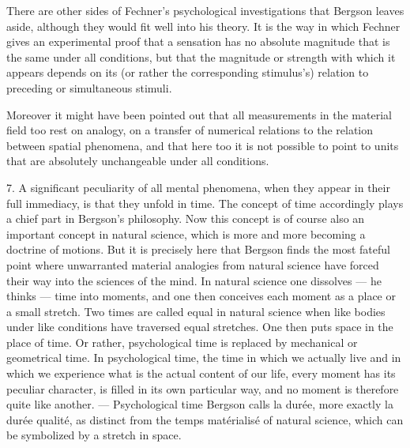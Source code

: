 \documentclass[12pt,a4paper,openany]{book}
\newcommand{\opage}[1]{\marginnote{\footnotesize\textit{[#1]}}}
\begin{document}
There are other sides of Fechner's psychological investigations that Bergson leaves aside, although they would fit well into his theory. It is the way in which Fechner gives an experimental proof that a sensation has no absolute magnitude that is the same under all conditions, but that the magnitude or strength with which it appears depends on its (or rather the corresponding stimulus's) relation to preceding or simultaneous stimuli.

Moreover it might have been pointed out that all measurements in the material field too rest on analogy, on a transfer of numerical relations to the relation between spatial phenomena, and that here too it is not possible to point to units that are absolutely unchangeable under all conditions.

7. A significant peculiarity of all mental phenomena, when they appear in their full immediacy, is that they unfold in time. The concept of time accordingly plays a chief part in Bergson's philosophy. Now this concept is of course also an important concept in natural science, which is more and more becoming a doctrine of motions. But it is precisely here that Bergson finds
\opage{15}the most fateful point where unwarranted material analogies from natural science have forced their way into the sciences of the mind. In natural science one dissolves --- he thinks --- time into moments, and one then conceives each moment as a place or a small stretch. Two times are called equal in natural science when like bodies under like conditions have traversed equal stretches. One then puts space in the place of time. Or rather, psychological time is replaced by mechanical or geometrical time. In psychological time, the time in which we actually live and in which we experience what is the actual content of our life, every moment has its peculiar character, is filled in its own particular way, and no moment is therefore quite like another. --- Psychological time Bergson calls la durée, more exactly la durée qualité, as distinct from the temps matérialisé of natural science, which can be symbolized by a stretch in space.
\end{document}
